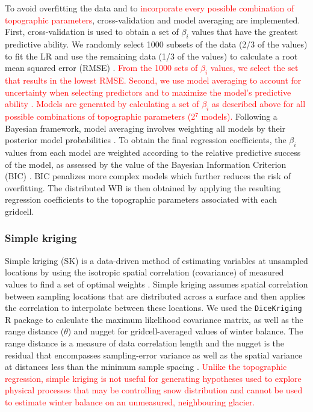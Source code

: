 \documentclass[twocolumn, letterpaper]{igs}
\begin{document}
To avoid overfitting the data and to \textcolor{red}{ incorporate every possible combination of topographic parameters}, cross-validation and model averaging are implemented. First, cross-validation is used to obtain a set of $\beta_i$ values that have the greatest predictive ability. We randomly select 1000 subsets of the data (2/3 of the values) to fit the LR and use the remaining data (1/3 of the values) to calculate a root mean squared error (RMSE) \citep{Kohavi1995}.\textcolor{red}{ From the 1000 sets of $\beta_i$ values, we select the set that results in the lowest RMSE. Second, we use model averaging to account for uncertainty when selecting predictors and to maximize the model's predictive ability \citep{Madigan1994}.  Models are generated by calculating a set of $\beta_i$ as described above for all possible combinations of topographic parameters (2$^7$ models).} Following a Bayesian framework, model averaging involves weighting all models by their posterior model probabilities \citep{Raftery1997}. To obtain the final regression coefficients, the $\beta_i$ values from each model are weighted according to the relative predictive success of the model, as assessed by the value of the Bayesian Information Criterion (BIC) \citep{Burnham2004}. BIC penalizes more complex models which further reduces the risk of overfitting. The distributed WB is then obtained by applying the resulting regression coefficients to the topographic parameters associated with each gridcell. 

\subsubsection{Simple kriging}

Simple kriging (SK) is a data-driven method of estimating variables at unsampled locations by using the isotropic spatial correlation (covariance) of measured values to find a set of optimal weights \citep{Davis1986, Li2008}. Simple kriging assumes spatial correlation between sampling locations that are distributed across a surface and then applies the correlation to interpolate between these locations. We used the \texttt{DiceKriging} R package \citep{Roustant2012} to calculate the maximum likelihood covariance matrix, as well as the range distance ($\theta$) and nugget for gridcell-averaged values of winter balance. The range distance is a measure of data correlation length and the nugget is the residual that encompasses sampling-error variance as well as the spatial variance at distances less than the minimum sample spacing \citep{Li2008}. \textcolor{red}{Unlike the topographic regression, simple kriging is not useful for generating hypotheses used to explore physical processes that may be controlling snow distribution and cannot be used to estimate winter balance on an unmeasured, neighbouring glacier.} 
\end{document}
